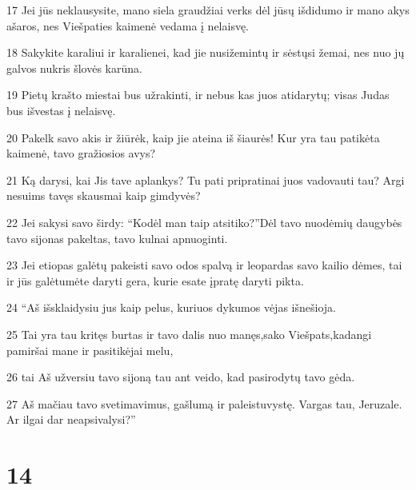 \par 17 Jei jūs neklausysite, mano siela graudžiai verks dėl jūsų išdidumo ir mano akys ašaros, nes Viešpaties kaimenė vedama į nelaisvę. 
\par 18 Sakykite karaliui ir karalienei, kad jie nusižemintų ir sėstųsi žemai, nes nuo jų galvos nukris šlovės karūna. 
\par 19 Pietų krašto miestai bus užrakinti, ir nebus kas juos atidarytų; visas Judas bus išvestas į nelaisvę. 
\par 20 Pakelk savo akis ir žiūrėk, kaip jie ateina iš šiaurės! Kur yra tau patikėta kaimenė, tavo gražiosios avys? 
\par 21 Ką darysi, kai Jis tave aplankys? Tu pati pripratinai juos vadovauti tau? Argi nesuims tavęs skausmai kaip gimdyvės? 
\par 22 Jei sakysi savo širdy: “Kodėl man taip atsitiko?”­Dėl tavo nuodėmių daugybės tavo sijonas pakeltas, tavo kulnai apnuoginti. 
\par 23 Jei etiopas galėtų pakeisti savo odos spalvą ir leopardas savo kailio dėmes, tai ir jūs galėtumėte daryti gera, kurie esate įpratę daryti pikta. 
\par 24 “Aš išsklaidysiu jus kaip pelus, kuriuos dykumos vėjas išnešioja. 
\par 25 Tai yra tau kritęs burtas ir tavo dalis nuo manęs,­sako Viešpats,­kadangi pamiršai mane ir pasitikėjai melu, 
\par 26 tai Aš užversiu tavo sijoną tau ant veido, kad pasirodytų tavo gėda. 
\par 27 Aš mačiau tavo svetimavimus, gašlumą ir paleistuvystę. Vargas tau, Jeruzale. Ar ilgai dar neapsivalysi?”



\chapter{14}


